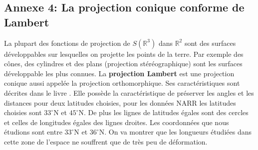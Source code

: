 \documentclass[a4paper,11pt]{article}
\numberwithin{equation}{section}
\begin{document}
\subsection{Annexe 4: La projection conique conforme de Lambert}
\label{proj-Lambert}
La plupart des fonctions de projection de $S(\mathbb{R}^3)$ dans $\mathbb{R}^2$ sont des surfaces développables sur lesquelles on projette les points de la terre. Par exemple des cônes, des cylindres et des plans (projection stéréographique) sont les surfaces développable les plus connues. La \textbf{projection Lambert} est une projection conique aussi appelée la projection orthomorphique. Ses caractéristiques sont décrites dans le livre \cite{grafarend2014map}. Elle possède la caractéristique de préserver les angles et les distances pour deux latitudes choisies, pour les données NARR les latitudes choisies sont $33^{\circ}$N et $45^{\circ}$N. De plus les lignes de latitudes égales sont des cercles et celles de longitudes égales des lignes droites. Les coordonnées que nous étudions sont entre $33^{\circ}$N et $36^{\circ}$N. On va montrer que les longueurs étudiées dans cette zone de l'espace ne souffrent que de très peu de déformation. 
\end{document}
